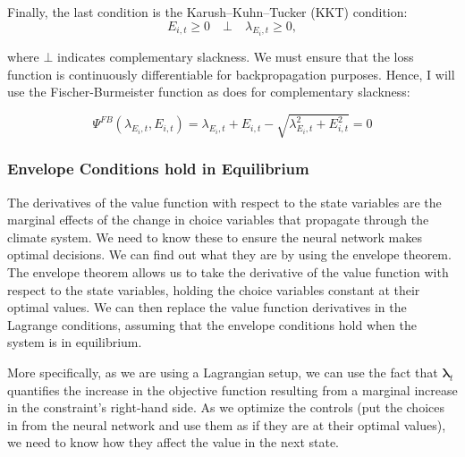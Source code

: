 Finally, the last condition is the Karush–Kuhn–Tucker (KKT) condition:
\begin{equation}
    E_{i,t} \geq 0 \quad \bot \quad \lambda_{E_i,t} \geq 0 ,
\end{equation}

where \(\bot\) indicates complementary slackness. We must ensure that the loss function is continuously differentiable for backpropagation purposes. Hence, I will use the Fischer-Burmeister function as \textcite{Maliar2021} does for complementary slackness:

\begin{equation}
        \Psi^{FB}(\lambda_{E_i,t},E_{i,t}) = \lambda_{E_i,t}+E_{i,t}-\sqrt{\lambda_{E_i,t}^2+E_{i,t}^2} = 0
\end{equation}



\subsubsection{Envelope Conditions hold in Equilibrium}

The derivatives of the value function with respect to the state variables are the marginal effects of the change in choice variables that propagate through the climate system. We need to know these to ensure the neural network makes optimal decisions. We can find out what they are by using the envelope theorem. The envelope theorem allows us to take the derivative of the value function with respect to the state variables, holding the choice variables constant at their optimal values. We can then replace the value function derivatives in the Lagrange conditions, assuming that the envelope conditions hold when the system is in equilibrium.

More specifically, as we are using a Lagrangian setup, we can use the fact that \(\bm{\lambda}_t\) quantifies the increase in the objective function resulting from a marginal increase in the constraint’s right-hand side. As we optimize the controls (put the choices in from the neural network and use them as if they are at their optimal values), we need to know how they affect the value in the next state.

